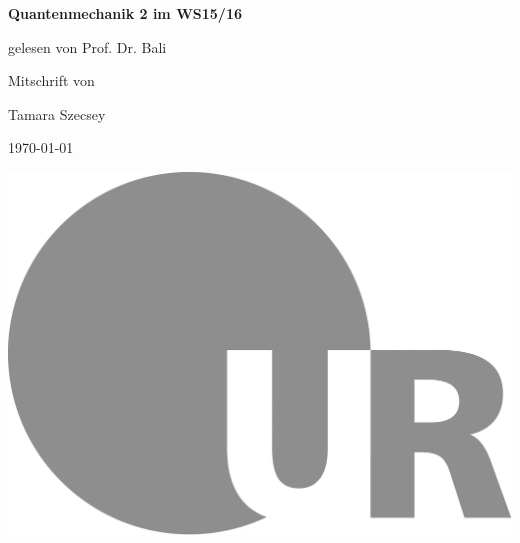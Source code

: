 \documentclass[ngerman, paper=a4, 12pt]{scrartcl}
\begin{document}
	\begin{titlepage}
		\begin{minipage}[c]{\textwidth}
			\begin{center}
				{ \Huge \textbf{Quantenmechanik 2 im WS15/16} }
				
				\vspace{1cm}
				{\Large{gelesen von Prof. Dr. Bali}}
				
				\vspace*{1cm}
				{\large Mitschrift von }
				
				\vspace*{0.2cm}
				{\Large Tamara Szecsey}
				
				\vspace*{1cm}
				{\large \today}
				
				\vspace*{3cm}
				\hspace*{1cm} \includegraphics[height=35ex]{LOGO_UR}
			\end{center}
		\end{minipage}
	\end{titlepage}
\tableofcontents
\newpage
\setcounter{section}{-1}
	
\end{document}
